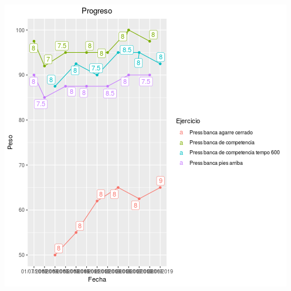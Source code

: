 \documentclass[11pt]{article}
\begin{document}
\begin{center}
\includegraphics[width=.9\linewidth]{tmp.png}
\end{center}
\end{document}
